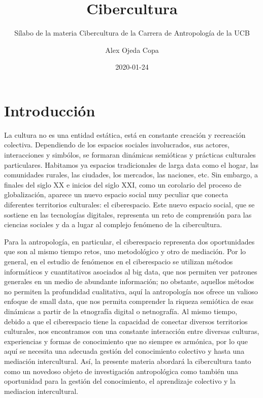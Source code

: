 \documentclass[]{book}
\title{Cibercultura}
\subtitle{Sílabo de la materia Cibercultura de la Carrera de Antropología de la UCB}
\author{Alex Ojeda Copa}
\date{2020-01-24}
\begin{document}
\maketitle

{
\setcounter{tocdepth}{1}
\tableofcontents
}
\hypertarget{introducciuxf3n}{%
\chapter*{Introducción}\label{introducciuxf3n}}

La cultura no es una entidad estática, está en constante creación y recreación colectiva. Dependiendo de los espacios sociales involucrados, sus actores, interacciones y simbólos, se formaran dinámicas semióticas y prácticas culturales particulares. Habitamos ya espacios tradicionales de larga data como el hogar, las comunidades rurales, las ciudades, los mercados, las naciones, etc. Sin embargo, a finales del siglo XX e inicios del siglo XXI, como un corolario del proceso de globalización, aparece un nuevo espacio social muy peculiar que conecta diferentes territorios culturales: el ciberespacio. Este nuevo espacio social, que se sostiene en las tecnologías digitales, representa un reto de comprensión para las ciencias sociales y da a lugar al complejo fenómeno de la cibercultura.

Para la antropología, en particular, el ciberespacio representa dos oportunidades que son al mismo tiempo retos, uno metodológico y otro de mediación. Por lo general, en el estudio de fenómenos en el ciberespacio se utilizan métodos informáticos y cuantitativos asociados al big data, que nos permiten ver patrones generales en un medio de abundante información; no obstante, aquellos métodos no permiten la profundidad cualitativa, aquí la antropología nos ofrece un valioso enfoque de small data, que nos permita comprender la riqueza semiótica de esas dinámicas a partir de la etnografía digital o netnografía. Al mismo tiempo, debido a que el ciberespacio tiene la capacidad de conectar diversos territorios culturales, nos encontramos con una constante interacción entre diversas culturas, experiencias y formas de conocimiento que no siempre es armónica, por lo que aquí se necesita una adecuada gestión del conocimiento colectivo y hasta una mediación intercultural. Así, la presente materia abordará la cibercultura tanto como un novedoso objeto de investigación antropológica como también una oportunidad para la gestión del conocimiento, el aprendizaje colectivo y la mediacion intercultural.
\end{document}
